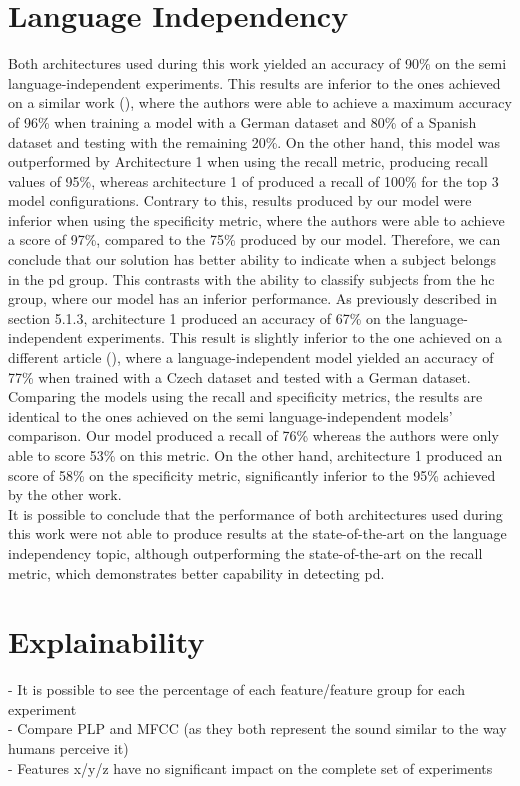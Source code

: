 \section{Language Independency}

Both architectures used during this work yielded an accuracy of 90\% on the semi language-independent experiments. This results are inferior to the ones achieved on a similar work (\cite{parkinson_three_languages}), where the authors were able to achieve a maximum accuracy of 96\% when training a model with a German dataset and 80\% of a Spanish dataset and testing with the remaining 20\%. On the other hand, this model was outperformed by Architecture 1 when using the recall metric, producing recall values  of 95\%, whereas architecture 1 of produced a recall of 100\% for the top 3 model configurations. Contrary to this, results produced by our model were inferior when using the specificity metric, where the authors were able to achieve a score of 97\%, compared to the 75\% produced by our model. Therefore, we can conclude that our solution has better ability to indicate when a subject belongs in the \gls{pd} group. This contrasts with the ability to classify subjects from the \gls{hc} group, where our model has an inferior performance. As previously described in section 5.1.3, architecture 1 produced an accuracy of 67\% on the language-independent experiments. This result is slightly inferior to the one achieved on a different article (\cite{parkinson_three_languages}), where a language-independent model yielded an accuracy of 77\% when trained with a Czech dataset and tested with a German dataset. Comparing the models using the recall and specificity metrics, the results are identical to the ones achieved on the semi language-independent models' comparison. Our model produced a recall of 76\% whereas the authors were only able to score 53\% on this metric. On the other hand, architecture 1 produced an score of 58\% on the specificity metric, significantly inferior to the 95\% achieved by the other work. \\
It is possible to conclude that the performance of both architectures used during this work were not able to produce results at the state-of-the-art on the language independency topic, although outperforming the state-of-the-art on the recall metric, which demonstrates better capability in detecting \gls{pd}.



\section{Explainability}

 - It is possible to see the percentage of each feature/feature group for each experiment \\
 - Compare PLP and MFCC (as they both represent the sound similar to the way humans perceive it) \\
 - Features x/y/z have no significant impact on the complete set of experiments \\